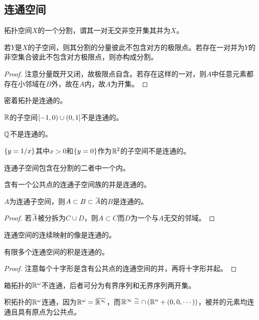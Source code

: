 \documentclass{ctexrep}
\begin{document}
  \subsection{连通空间}
  \begin{definition}
    拓扑空间$X$的一个分割，谓其一对无交非空开集其并为$X$。
  \end{definition}
  \begin{lemma}
    若$Y$是$X$的子空间，则其分割的分量彼此不包含对方的极限点。若存在一对并为$Y$的非空集合彼此不包含对方极限点，则亦构成分割。
  \end{lemma}
  \begin{proof}
    注意分量既开又闭，故极限点自含。若存在这样的一对，则$A$中任意元素都存在小邻域在$B$外，故在$A$内，故$A$为开集。
  \end{proof}
  \begin{ex}
    密着拓扑是连通的。
  \end{ex}
  \begin{ex}
    $\mathbb{R}$的子空间$\left[-1,0\right)\cup\left(0,1\right]$不是连通的。
  \end{ex}
  \begin{ex}
    $\mathbb{Q}$不是连通的。
  \end{ex}
  \begin{ex}
    $\left\{y=1/x\right\}$其中$x>0$和$\left\{y=0\right\}$作为$\mathbb{R}^2$的子空间不是连通的。
  \end{ex}
  \begin{lemma}
    连通子空间包含在分割的二者中一个内。
  \end{lemma}
  \begin{theorem}
    含有一个公共点的连通子空间族的并是连通的。
  \end{theorem}
  \begin{theorem}
    $A$为连通子空间，则$A\subset B \subset \clo{A}$的$B$是连通的。
  \end{theorem}
  \begin{proof}
    若$\clo{A}$被分拆为$C\cup D$，则$A\subset C$而$D$为一个与$A$无交的邻域。
  \end{proof}
  \begin{theorem}
    \label{thm:connectcontin}
    连通空间的连续映射的像是连通的。
  \end{theorem}
  \begin{theorem}
    有限多个连通空间的积是连通的。
  \end{theorem}
  \begin{proof}
    注意每个十字形是含有公共点的连通空间的并，再将十字形并起。
  \end{proof}
  \begin{ex}
    箱拓扑的$\mathbb{R}^\omega$不连通，后者可分为有界序列和无界序列两开集。
  \end{ex}
  \begin{ex}
    积拓扑的$\mathbb{R}^\omega$连通，因为$\R^\omega=\clo{\R^\infty}$，而$\mathbb{R}^\infty\overset{\sim}{=}\cap\left(\mathbb{R}^n+\left(0,0,\cdots\right)\right)$，被并的元素均连通且具有原点为公共点。
  \end{ex}
\end{document}
